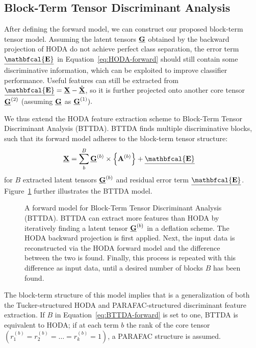 \subsection{Block-Term Tensor Discriminant Analysis}
After defining the forward model, we can construct our proposed block-term
tensor model.
Assuming the latent tensors $\underline{\mathbf{G}}$
obtained by the backward projection of HODA do not achieve perfect
class separation, the error term $\ten{\mathbfcal{E}}$ in
Equation~\ref{eq:HODA-forward} should still contain some discriminative
information, which can be exploited to improve classifier
performance.
Useful features can still be extracted from $\ten{\mathbfcal{E}} = \ten{X} -
\hat{\ten{X}}$, so it is further projected onto another core tensor
$\underline{\mathbf{G}}^{(2)}$ (assuming $\underline{\mathbf{G}}$ as $\underline{\mathbf{G}}^{(1)}).$

We thus extend the HODA feature extraction scheme to Block-Term Tensor Discriminant Analysis
(BTTDA).
BTTDA finds multiple discriminative blocks, such that its forward
model adheres to the block-term tensor structure:
\begin{align}
	\ten{X} & = \sum_b^B\ten{G}^{(b)}\mmpr{\mat{A}^{(b)}} + \ten{\mathbfcal{E}}
	\label{eq:BTTDA-forward}
\end{align}
for $B$ extracted latent tensors $\underline{\mathbf{G}}^{(b)}$ and residual error term
$\ten{\mathbfcal{E}}$.
Figure~\ref{fig:BTTDA} further illustrates the BTTDA model.
\begin{figure}[t]
	\centering
	
  \caption[A forward model for \ac{bttda}.]{A forward model for Block-Term Tensor Discriminant Analysis
		(BTTDA). BTTDA can extract more features
		than HODA by iteratively finding a latent tensor $\underline{\mathbf{G}}^{(b)}$ in a
		deflation scheme.
		The HODA backward projection is first applied. Next, the
		input data is reconstructed via the HODA forward model and the
		difference between the two is found.
		Finally, this process is repeated with this difference as input data, until a
		desired number of blocks $B$ has been found.}
	\label{fig:BTTDA}
\end{figure}
The block-term structure of this model implies that is a generalization of both
the Tucker-structured HODA and PARAFAC-structured discriminant feature
extraction.
If $B$ in Equation~\ref{eq:BTTDA-forward} is set to one, BTTDA is equivalent to
HODA; if at each term $b$ the rank of the core tensor
$(r_1^{(b)}=r_2^{(b)}=\ldots=r_k^{(b)}=1)$, a PARAFAC structure is assumed.

